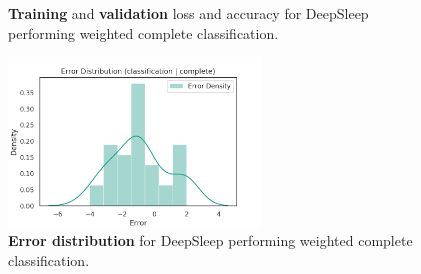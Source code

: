 \documentclass[11pt]{scrartcl}
\begin{document}
\begin{figure}[!hbt]
	\caption{\textcolor{viridis9}{\textbf{Training}} and \textcolor{viridis0}{\textbf{validation}} loss and accuracy for DeepSleep performing weighted complete classification.}
\end{figure}

\begin{figure}[hbt]
	\centering
	\includegraphics[width=0.6\textwidth,center]{img/learning/original_gdansk_sleepnet_classification_complete_none_weighted_error_distribution.png}
	\caption{\textcolor{viridis5}{\textbf{Error distribution}} for DeepSleep performing weighted complete classification.}
	\label{fig:original_gdansk_sleepnet_classification_complete_none_weighted_error_distribution}
\end{figure}
\end{document}
